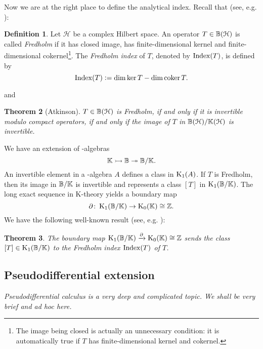 \documentclass[reqno]{scrartcl}
\newtheorem{theorem}{Theorem}[section]
\theoremstyle{definition}
\newtheorem{definition}[theorem]{Definition}
\theoremstyle{remark}
\newcommand{\Hilb}{\mathcal{H}}
\begin{document}
Now we are at the right place to define the analytical index. Recall that (see, e.g. \cite[Chapter 14]{olsen1994k}):
\begin{definition}
Let $\Hilb$ be a complex Hilbert space. An operator $T\in\Bdd(\Hilb)$ is called \emph{Fredholm} if it has closed image, has finite-dimensional kernel and finite-dimensional cokernel\footnote{The image being closed is actually an unnecessary condition: it is automatically true if $T$ has finite-dimensional kernel and cokernel.}. The \emph{Fredholm index} of $T$, denoted by $\operatorname{Index}(T)$, is defined by
\[ \operatorname{Index}(T)\mathrel{\vcentcolon=}\dim\operatorname{ker} T-\dim\operatorname{coker} T. \]
\end{definition}
and
\begin{theorem}[Atkinson]
$T\in\Bdd(\Hilb)$ is Fredholm, if and only if it is invertible modulo compact operators, if and only if the image of $T$ in $\Bdd(\Hilb)/\Cpt(\Hilb)$ is invertible.
\end{theorem}
We have an extension of \Cst-algebras
\[ \mathbb{K}\rightarrowtail\mathbb{B}\twoheadrightarrow\mathbb{B}/\mathbb{K}. \]
An invertible element in a \Cst-algebra $A$ defines a class in $\operatorname{K}_1(A)$. If $T$ is Fredholm, then its image in $\mathbb{B}/\mathbb{K}$ is invertible and represents a class $[T]$ in $\operatorname{K}_1(\mathbb{B}/\mathbb{K})$. The long exact sequence in K-theory yields a boundary map
\[ \partial\colon\operatorname{K}_1(\mathbb{B}/\mathbb{K})\to\operatorname{K}_0(\mathbb{K})\cong\mathbb{Z}. \]
We have the following well-known result (see, e.g. \cite[Chapter 14]{olsen1994k}):
\begin{theorem} 
The boundary map $\operatorname{K}_1(\mathbb{B}/\mathbb{K})\xrightarrow{\partial}\operatorname{K}_0(\mathbb{K})\cong\mathbb{Z}$ sends the class $[T]\in\operatorname{K}_1(\mathbb{B}/\mathbb{K})$ to the Fredholm index $\operatorname{Index}(T)$ of $T$.
\end{theorem}

\subsection{Pseudodifferential extension}
\textit{Pseudodifferential calculus is a very deep and complicated topic. We shall be very brief and ad hoc here.}
\end{document}
